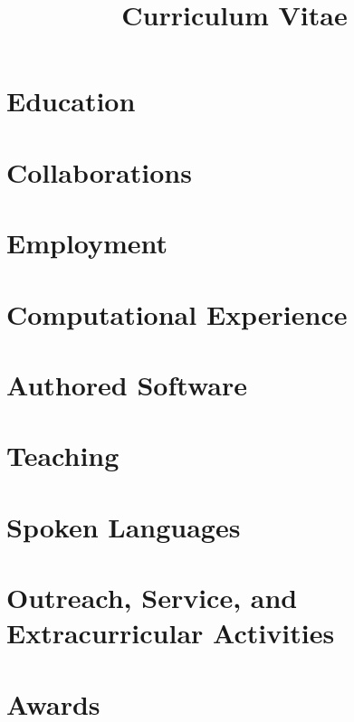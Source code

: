 \documentclass[10pt,letterpaper,roman]{moderncv} %
\title{Curriculum Vitae}
\begin{document}

\makecvtitle %

\section{Education}


\section{Collaborations}


\section{Employment}


\section{Computational Experience}


\section{Authored Software}


\section{Teaching}


\section{Spoken Languages}


\section{Outreach, Service, and Extracurricular Activities}


\section{Awards}



\end{document}
